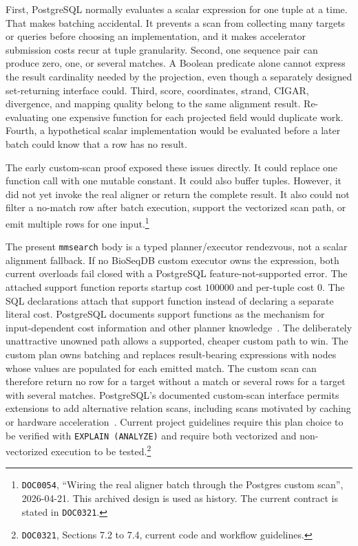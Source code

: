 First, PostgreSQL normally evaluates a scalar expression for one tuple at
a time.  That makes batching accidental.  It prevents a scan from
collecting many targets or queries before choosing an implementation, and
it makes accelerator submission costs recur at tuple granularity.
Second, one sequence pair can produce zero, one, or several matches.  A
Boolean predicate alone cannot express the result cardinality needed by
the projection, even though a separately designed set-returning interface
could.  Third, score, coordinates, strand, CIGAR, divergence,
and mapping quality belong to the same alignment result.  Re-evaluating
one expensive function for each projected field would duplicate work.
Fourth, a hypothetical scalar implementation would be evaluated before a
later batch could know that a row has no result.

The early custom-scan proof exposed these issues directly.  It could replace
one function call with one mutable constant.  It could also buffer tuples.
However, it did not yet invoke the real aligner or return the complete result.
It also could not filter a no-match row after batch execution, support the
vectorized scan path, or emit multiple rows for one input.\footnote{
\texttt{DOC0054}, ``Wiring the real aligner batch through the Postgres
custom scan'', 2026-04-21.  This archived design is used as history.
The current contract is stated in \texttt{DOC0321}.}

The present \texttt{mmsearch} body is a typed planner/executor rendezvous, not
a scalar alignment fallback.  If no BioSeqDB custom executor owns the
expression, both current overloads fail closed with a PostgreSQL
feature-not-supported error.  The attached support function reports startup
cost \(100000\) and per-tuple cost \(0\).  The SQL declarations attach that
support function instead of declaring a separate literal cost.  PostgreSQL documents
support functions as the mechanism for input-dependent cost information and
other planner knowledge~\cite{postgresql17_support_functions}.
The deliberately unattractive unowned path allows a supported, cheaper custom
path to win.  The custom plan owns batching and replaces result-bearing
expressions with nodes whose values are populated for each emitted match.
The custom scan can therefore return no row for a target without a match
or several rows for a target with several matches.  PostgreSQL's documented
custom-scan interface permits extensions to add alternative relation scans,
including scans motivated by caching or hardware
acceleration~\cite{postgresql17_custom_scan}. Current project
guidelines require this plan choice to be verified with
\texttt{EXPLAIN (ANALYZE)} and require both vectorized and
non-vectorized execution to be tested.\footnote{\texttt{DOC0321},
Sections 7.2 to 7.4, current code and workflow guidelines.}

